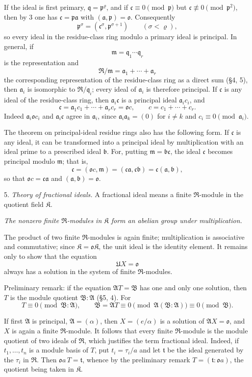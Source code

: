 \documentclass[11pt]{article}
\providecommand{\mR}{\mathfrak{R}}
\providecommand{\mK}{\mathfrak{K}}
\providecommand{\ma}{\mathfrak{a}}
\providecommand{\mb}{\mathfrak{b}}
\providecommand{\mc}{\mathfrak{c}}
\providecommand{\mm}{\mathfrak{m}}
\providecommand{\mo}{\mathfrak{o}}
\providecommand{\mpideal}{\mathfrak{p}}
\providecommand{\mq}{\mathfrak{q}}
\providecommand{\mt}{\mathfrak{t}}
\begin{document}
If the ideal is first primary, $\mq=\mpideal^\varrho$, and if $\mc\equiv0\pmod{\mpideal}$ but $\mc\not\equiv0\pmod{\mpideal^2}$, then by 3 one has $\mc=\mpideal\ma$ with $(\ma,\mpideal)=\mo$. Consequently
\[
        \mpideal^\sigma=(\mc^\sigma,\mpideal^{\sigma+1})
        \qquad(\sigma<\varrho),
\]
so every ideal in the residue-class ring modulo a primary ideal is principal. In general, if
\[
        \mm=\mq_1\cdots\mq_r
\]
is the representation and
\[
        \mR/\mm=\ma_1+\cdots+\ma_r
\]
the corresponding representation of the residue-class ring as a direct sum (§4, 5), then $\ma_i$ is isomorphic to $\mR/\mq_i$; every ideal of $\ma_i$ is therefore principal. If $\mc$ is any ideal of the residue-class ring, then $\ma_i\mc$ is a principal ideal $\ma_i c_i$, and
\[
        \mc=\ma_1c_1+\cdots+\ma_r c_r=\mo c,
        \qquad c=c_1+\cdots+c_r.
\]
Indeed $\ma_i\mo c_i$ and $\ma_i\mc$ agree in $\ma_i$, since $\ma_i\ma_k=(0)$ for $i\ne k$ and $c_i\equiv0\pmod{\ma_i}$.

The theorem on principal-ideal residue rings also has the following form. If $\mc$ is any ideal, it can be transformed into a principal ideal by multiplication with an ideal prime to a prescribed ideal $\mb$. For, putting $\mm=\mb\mc$, the ideal $\mc$ becomes principal modulo $\mm$; that is,
\[
        \mc=(\mo c,\mm)=(\mc\ma,\mc\mb)=\mc(\ma,\mb),
\]
so that $\mo c=\mc\ma$ and $(\ma,\mb)=\mo$.

5. \emph{Theory of fractional ideals.} A fractional ideal means a finite $\mR$-module in the quotient field $\mK$.

\emph{The nonzero finite $\mR$-modules in $\mK$ form an abelian group under multiplication.}

The product of two finite $\mR$-modules is again finite; multiplication is associative and commutative; since $\mK=\mo\mK$, the unit ideal is the identity element. It remains only to show that the equation
\[
        \mathfrak U X=\mo
\]
always has a solution in the system of finite $\mR$-modules.

Preliminary remark: if the equation $\mathfrak A T=\mathfrak B$ has one and only one solution, then $T$ is the module quotient $\mathfrak B:\mathfrak A$ (§5, 4). For
\[
        T\equiv0\pmod{\mathfrak B:\mathfrak A},
        \qquad
        \mathfrak B=\mathfrak A T\equiv0\pmod{\mathfrak A(\mathfrak B:\mathfrak A)}\equiv0\pmod{\mathfrak B}.
\]

If first $\mathfrak A$ is principal, $\mathfrak A=(\alpha)$, then $X=(e/\alpha)$ is a solution of $\mathfrak A X=\mo$, and $X$ is again a finite $\mR$-module. It follows that every finite $\mR$-module is the module quotient of two ideals of $\mR$, which justifies the term fractional ideal. Indeed, if $t_1,\ldots,t_n$ is a module basis of $T$, put $t_i=\tau_i/a$ and let $\mt$ be the ideal generated by the $\tau_i$ in $\mR$. Then $\mo a\,T=\mt$, whence by the preliminary remark $T=(\mt:\mo a)$, the quotient being taken in $\mK$.
\end{document}
